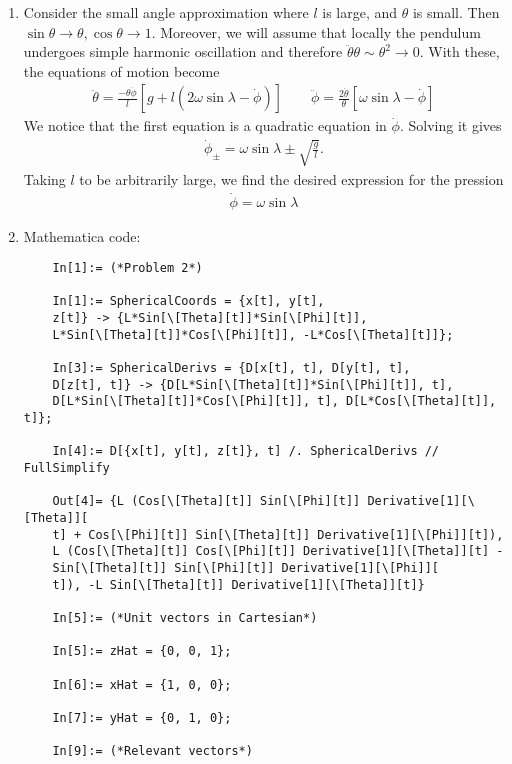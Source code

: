 \documentclass{article}
\theoremstyle{definition}
\newcommand{\f}[2]{\frac{#1}{#2}}
\newcommand{\lb}{\left[}
\newcommand{\rb}{\right]}
\begin{document}
\begin{enumerate}[label=(\alph*)]
	
	\item Consider the small angle approximation where $l$ is large, and $\theta$ is small. Then $\sin\theta \to \theta, \cos\theta \to 1$. Moreover, we will assume that locally the pendulum undergoes simple harmonic oscillation and therefore $\ddot\theta \theta \sim \theta^2 \to 0$. With these, the equations of motion become
	\begin{align*}
	\boxed{\ddot\theta = \f{-\theta \dot\phi }{l}\lb g+ l(2\omega\sin\lambda - \dot\phi) \rb} 
	\quad \quad 
	\boxed{\ddot\phi = \f{2\dot\theta }{\theta} \lb \omega\sin\lambda - \dot\phi \rb }
	\end{align*}
	We notice that the first equation is a quadratic equation in $\dot\phi$. Solving it gives
	\begin{align*}
	\dot\phi_\pm = \omega \sin\lambda \pm \sqrt{\f{g}{l}}.
	\end{align*}
	Taking $l$ to be arbitrarily large, we find the desired expression for the pression 
	\begin{align*}
	\boxed{\dot\phi = \omega\sin\lambda}
	\end{align*}
	
	
	\item Mathematica code:
	\begin{lstlisting}
	In[1]:= (*Problem 2*)
	
	In[1]:= SphericalCoords = {x[t], y[t], 
	z[t]} -> {L*Sin[\[Theta][t]]*Sin[\[Phi][t]], 
	L*Sin[\[Theta][t]]*Cos[\[Phi][t]], -L*Cos[\[Theta][t]]};
	
	In[3]:= SphericalDerivs = {D[x[t], t], D[y[t], t], 
	D[z[t], t]} -> {D[L*Sin[\[Theta][t]]*Sin[\[Phi][t]], t], 
	D[L*Sin[\[Theta][t]]*Cos[\[Phi][t]], t], D[L*Cos[\[Theta][t]], t]};
	
	In[4]:= D[{x[t], y[t], z[t]}, t] /. SphericalDerivs // FullSimplify
	
	Out[4]= {L (Cos[\[Theta][t]] Sin[\[Phi][t]] Derivative[1][\[Theta]][
	t] + Cos[\[Phi][t]] Sin[\[Theta][t]] Derivative[1][\[Phi]][t]), 
	L (Cos[\[Theta][t]] Cos[\[Phi][t]] Derivative[1][\[Theta]][t] - 
	Sin[\[Theta][t]] Sin[\[Phi][t]] Derivative[1][\[Phi]][
	t]), -L Sin[\[Theta][t]] Derivative[1][\[Theta]][t]}
	
	In[5]:= (*Unit vectors in Cartesian*)
	
	In[5]:= zHat = {0, 0, 1};
	
	In[6]:= xHat = {1, 0, 0};
	
	In[7]:= yHat = {0, 1, 0};
	
	In[9]:= (*Relevant vectors*)
	

\end{lstlisting}
\end{enumerate}
\end{document}
